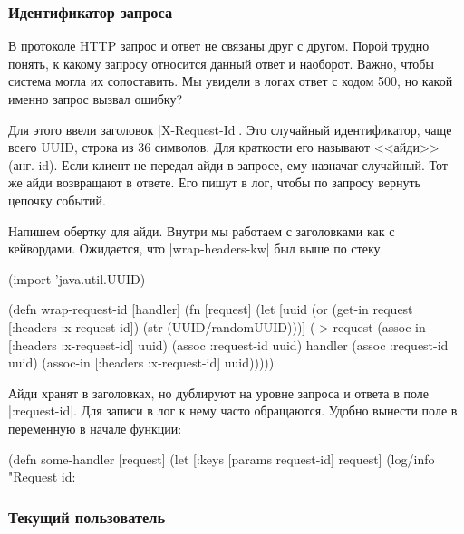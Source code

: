 \subsubsection*{Идентификатор запроса}

В протоколе HTTP запрос и ответ не связаны друг с другом. Порой трудно понять, к
какому запросу относится данный ответ и наоборот. Важно, чтобы система могла их
сопоставить. Мы увидели в логах ответ с кодом 500, но какой именно запрос вызвал
ошибку?

Для этого ввели заголовок \spverb|X-Request-Id|. Это случайный идентификатор,
чаще всего UUID, строка из 36 символов. Для краткости его называют <<айди>>
(анг. id). Если клиент не передал айди в запросе, ему назначат случайный. Тот же
айди возвращают в ответе. Его пишут в лог, чтобы по запросу вернуть цепочку
событий.

Напишем обертку для айди. Внутри мы работаем с заголовками как с
кейвордами. Ожидается, что \spverb|wrap-headers-kw| был выше по стеку.

\begin{english}
  \begin{clojure}
(import 'java.util.UUID)

(defn wrap-request-id [handler]
  (fn [request]
    (let [uuid (or (get-in request [:headers :x-request-id])
                   (str (UUID/randomUUID)))]
      (-> request
          (assoc-in [:headers :x-request-id] uuid)
          (assoc :request-id uuid)
          handler
          (assoc :request-id uuid)
          (assoc-in [:headers :x-request-id] uuid)))))
  \end{clojure}
\end{english}

Айди хранят в заголовках, но дублируют на уровне запроса и ответа в поле
\spverb|:request-id|. Для записи в лог к нему часто обращаются. Удобно вынести
поле в переменную в начале функции:

\begin{english}
  \begin{clojure}
(defn some-handler [request]
  (let [{:keys [params request-id]} request]
    (log/info "Request id: %
  \end{clojure}
\end{english}

\subsubsection*{Текущий пользователь}

